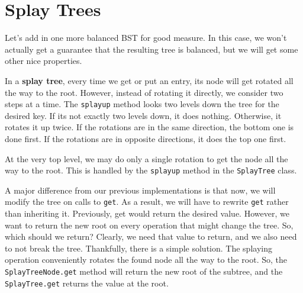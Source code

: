 \section{Splay Trees}


Let's add in one more balanced BST for good measure.
In this case, we won't actually get a guarantee that the resulting tree is balanced, but we will get some other nice properties.


In a \textbf{splay tree}, every time we get or put an entry, its node will get rotated all the way to the root.
However, instead of rotating it directly, we consider two steps at a time.
The \texttt{splayup} method looks two levels down the tree for the desired key.
If its not exactly two levels down, it does nothing.
Otherwise, it rotates it up twice.
If the rotations are in the same direction, the bottom one is done first.
If the rotations are in opposite directions, it does the top one first.


At the very top level, we may do only a single rotation to get the node all the way to the root.
This is handled by the \texttt{splayup} method in the \texttt{SplayTree} class.


A major difference from our previous implementations is that now, we will modify the tree on calls to \texttt{get}.
As a result, we will have to rewrite \texttt{get} rather than inheriting it.
Previously, get would return the desired value.
However, we want to return the new root on every operation that might change the tree.
So, which should we return?
Clearly, we need that value to return, and we also need to not break the tree.
Thankfully, there is a simple solution.
The splaying operation conveniently rotates the found node all the way to the root.
So, the \texttt{SplayTreeNode.get} method will return the new root of the subtree, and the \texttt{SplayTree.get} returns the value at the root.

